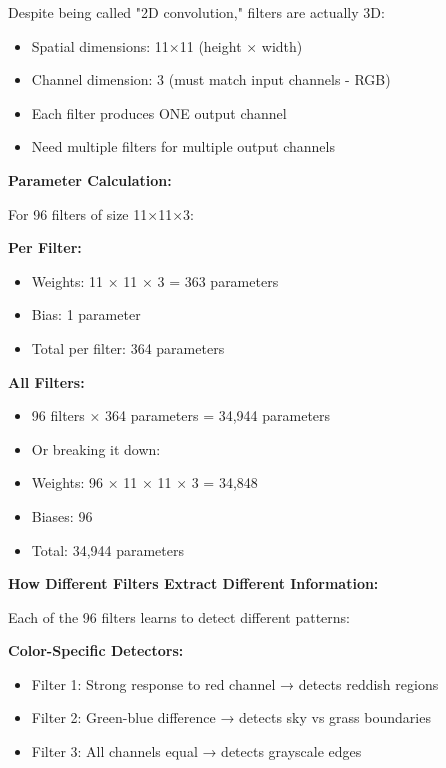 \documentclass[12pt]{article}
\newcommand{\explanation}[1]{{\color{explanationcolor}#1}}
\begin{document}
\begin{enumerate}[(a)]
{    \explanation{
    Despite being called "2D convolution," filters are actually 3D:
    \begin{itemize}
        \item Spatial dimensions: 11×11 (height × width)
        \item Channel dimension: 3 (must match input channels - RGB)
        \item Each filter produces ONE output channel
        \item Need multiple filters for multiple output channels
    \end{itemize}
    }
    
    \textbf{Parameter Calculation:}
    
    \explanation{
    For 96 filters of size 11×11×3:
    
    \textbf{Per Filter:}
    \begin{itemize}
        \item Weights: 11 × 11 × 3 = 363 parameters
        \item Bias: 1 parameter
        \item Total per filter: 364 parameters
    \end{itemize}
    
    \textbf{All Filters:}
    \begin{itemize}
        \item 96 filters × 364 parameters = 34,944 parameters
        \item Or breaking it down:
        \item Weights: 96 × 11 × 11 × 3 = 34,848
        \item Biases: 96
        \item Total: 34,944 parameters
    \end{itemize}
    }
    
    \textbf{How Different Filters Extract Different Information:}
    
    \explanation{
    Each of the 96 filters learns to detect different patterns:
    
    \textbf{Color-Specific Detectors:}
    \begin{itemize}
        \item Filter 1: Strong response to red channel → detects reddish regions
        \item Filter 2: Green-blue difference → detects sky vs grass boundaries
        \item Filter 3: All channels equal → detects grayscale edges
    \end{itemize}
    
}}
\end{enumerate}
\end{document}
